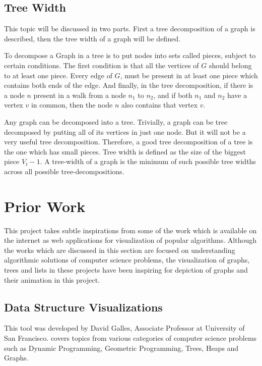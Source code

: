 \subsection{Tree Width}
\label{explanation: treewidth}
This topic will be discussed in two parts. First a tree decomposition of a
graph is described, then the tree width of a graph will be defined.

To decompose a Graph in a tree is to put nodes into sets called pieces, subject
to certain conditions.  The first condition is that all the vertices of $G$
should belong to at least one piece. Every edge of $G$, must be present in
at least one piece which contains both ends of the edge.  And finally, in the
tree decomposition, if there is a node $n$ present in a walk from a node $n_1$
to $n_2$, and if both $n_1$ and $n_2$ have a vertex $v$ in common, then the node
$n$ also contains that vertex $v$. 

Any graph can be decomposed into a tree. Trivially, a graph can be tree
decomposed by putting all of its vertices in just one node. But it will not be
a very useful tree decomposition.  Therefore, a good tree decomposition of a
tree is the one which has small pieces.  Tree width is defined as the size of
the biggest piece $V_t - 1$. A tree-width of a graph is the minimum of such
possible tree widths across all possible tree-decompositions. \cite{KleinbergTardos06}

\section{Prior Work}
This project takes subtle inspirations from some of the work which is available
on the internet as web applications for visualization of popular algorithms.
Although the works which are discussed in this section are focused on
understanding algorithmic solutions of computer science problems, the
visualization of graphs, trees and lists in these projects have been inspiring
for depiction of graphs and their animation in this project.

\subsection{Data Structure Visualizations}
\label{priorWork: datastrucvisu}
This tool was developed by David Galles, Associate Professor at University of San
Francisco. \cite{Galles} covers topics
from various categories of computer science problems such as Dynamic
Programming, Geometric Programming, Trees, Heaps and Graphs.

